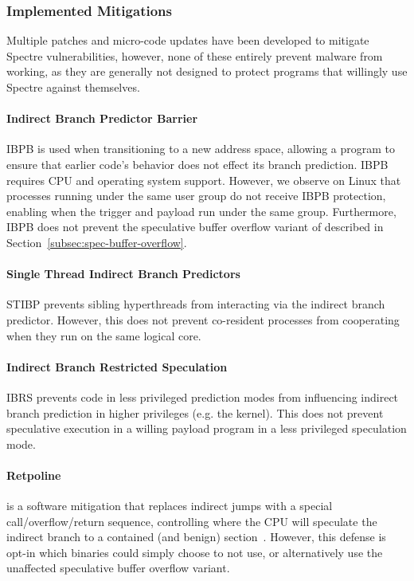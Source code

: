\subsubsection{Implemented Mitigations}
Multiple patches and micro-code updates have been developed to mitigate Spectre
vulnerabilities, however, none of these entirely prevent \speculake malware from
working, as they are generally not designed to protect programs that willingly
use Spectre against themselves.

\paragraph{Indirect Branch Predictor Barrier}IBPB is used when transitioning to
a new address space, allowing a program to ensure that earlier code's behavior
does not effect its branch prediction. IBPB requires CPU and operating system
support. However, we observe on Linux that processes running under the same user
group do not receive IBPB protection, enabling \speculake when the trigger and
payload run under the same group. Furthermore, IBPB does not prevent the
speculative buffer overflow variant of \speculake described in
Section~\ref{subsec:spec-buffer-overflow}.


\paragraph{Single Thread Indirect Branch Predictors}STIBP prevents sibling
hyperthreads from interacting via the indirect branch predictor. However, this
does not prevent co-resident processes from cooperating when they run on the
same logical core.

\paragraph{Indirect Branch Restricted Speculation}IBRS prevents code in less
privileged prediction modes from influencing indirect branch prediction in
higher privileges (e.g. the kernel). This does not
prevent speculative execution in a willing payload program in a less privileged
speculation mode.

\paragraph{Retpoline}is a software mitigation that replaces indirect jumps with
a special call/overflow/return sequence, controlling where the CPU will
speculate the indirect branch to a contained (and benign)
section~\cite{retpoline}. However, this defense is opt-in which \speculake
binaries could simply choose to not use, or alternatively use the unaffected
speculative buffer overflow variant.

